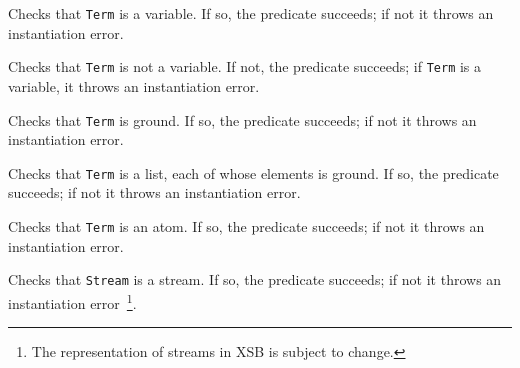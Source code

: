 \begin{description}
Checks that {\tt Term} is a variable.  If so, the predicate succeeds;
if not it throws an instantiation error.

Checks that {\tt Term} is not a variable.  If not, the predicate succeeds;
if {\tt Term} is a variable,  it throws an instantiation error.

Checks that {\tt Term} is ground.  If so, the predicate succeeds;
if not it throws an instantiation error.

Checks that {\tt Term} is a list, each of whose elements is ground.
If so, the predicate succeeds; if not it throws an instantiation
error.
	    
Checks that {\tt Term} is an atom.  If so, the predicate succeeds;
if not it throws an instantiation error.

Checks that {\tt Stream} is a stream.  If so, the predicate succeeds;
if not it throws an instantiation error~\footnote{The representation
of streams in XSB is subject to change.}.

\end{description}

